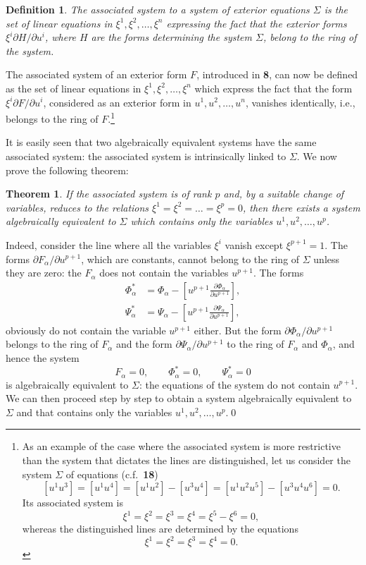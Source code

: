 \documentclass[leqno,11pt]{book}
\numberwithin{equation}{chapter}
\newcommand{\pd}{\partial}
\theoremstyle{shape1}
\newtheorem*{thm*}{\hspace{15pt}Theorem}
\newtheorem*{dfn*}{\hspace{15pt}Definition}
\theoremstyle{shape0}
\theoremstyle{shape2}
\theoremstyle{definition}
\begin{document}
\begin{dfn*}
  The associated system to a system of exterior equations $\Sigma$ is the set of linear equations in $\xi^{1},\xi^{2},\dots,\xi^{n}$  expressing the fact that the exterior forms $\xi^{i}\pd H/\pd u^{i}$, where $H$ are the forms determining the system $\Sigma$, belong to the ring of the system.
\end{dfn*}

The associated system of an exterior form $F$, introduced in \textsection\textbf{8}, can now be defined as the set of linear equations in $\xi^{1},\xi^{2},\dots,\xi^{n}$ which express the fact that the form $\xi^{i}\pd F/\pd u^{i}$, considered as an exterior form in $u^{1},u^{2},\dots,u^{n}$, vanishes identically, {i.e.}, belongs to the ring of $F$.\footnote{As an example of the case where the associated system is more restrictive than the system that dictates the lines are distinguished, let us consider the system $\Sigma$ of equations ({c.f.}~\textsection\textbf{18})
\[
[u^{1}u^{3}]=
[u^{1}u^{4}]=
[u^{1}u^{2}]-[u^{3}u^{4}]=
[u^{1}u^{2}u^{5}]-[u^{3}u^{4}u^{6}]=
0.
\]
Its associated system is
\[
\xi^{1}=
\xi^{2}=
\xi^{3}=
\xi^{4}=
\xi^{5}-
\xi^{6}=
0,
\]
whereas the distinguished lines are determined by the equations
\[
\xi^{1}=
\xi^{2}=
\xi^{3}=
\xi^{4}=
0.
\]
}

\vspace{12pt}\fsec It is easily seen that two algebraically equivalent systems have the same associated system: the associated system is intrinsically linked to $\Sigma$. We now prove the following theorem:
\begin{thm*}
  If the associated system is of rank $p$ and, by a suitable change of variables, reduces to the relations $\xi^{1}=\xi^{2}=\dots=\xi^{p}=0$, then there exists a system algebraically equivalent to $\Sigma$ which contains only the variables $u^{1},u^{2},\dots,u^{p}$.
\end{thm*}

Indeed, consider the line where all the variables $\xi^{i}$  vanish except $\xi^{p+1}=1$. The forms $\pd F_{\alpha}/\pd u^{p+1}$, which are constants, cannot belong to the ring of $\Sigma$ unless they are zero: the $F_{\alpha}$ does not contain the variables $u^{p+1}$. The forms
\begin{align*}
  \Phi^{*}_{\alpha}&=\Phi_{\alpha}-\left[u^{p+1}\frac{\pd\Phi_{\alpha}}{\pd u^{p+1}}\right],\\
  \Psi^{*}_{\alpha}&=\Psi_{\alpha}-\left[u^{p+1}\frac{\pd\Psi_{\alpha}}{\pd u^{p+1}}\right],
\end{align*}
obviously do not contain the variable $u^{p+1}$ either. But the form $\pd\Phi_{\alpha}/\pd u^{p+1}$ belongs to the ring of $F_{\alpha}$ and the form $\pd\Psi_{\alpha}/\pd u^{p+1}$ to the ring of $F_{\alpha}$ and $\Phi_{\alpha}$, and hence the system
\[
F_{\alpha}=0,\qquad \Phi^{*}_{\alpha}=0,\qquad \Psi^{*}_{\alpha}=0
\]
is algebraically equivalent to $\Sigma$: the equations of the system do not contain $u^{p+1}$. We can then proceed step by step to obtain a system algebraically equivalent to $\Sigma$ and that contains only the variables $u^{1},u^{2},\dots,u^{p}$.\qed
\end{document}
